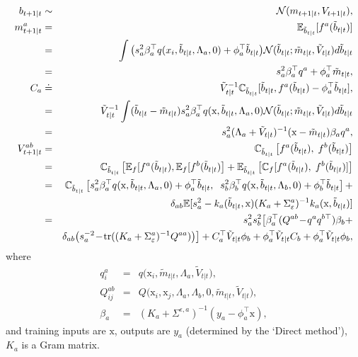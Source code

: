 \documentclass{article}
\newcommand{\N}{\mathcal{N}}
\newcommand{\C}{{\mathbb C}}
\newcommand{\E}{{\mathbb E}}
\newcommand{\unot}[1]{\tilde #1_{t|t}}     %
\newcommand{\pne}[1]{#1_{t+1|t}}   %
\newcommand{\inv}{^{-1}}
\newcommand{\nnn}{\nonumber \\}
\newcommand{\nn}{\nonumber}
\newcommand{\fb}{f} %
\newcommand{\bm}{m} %
\newcommand{\newlinetimesdist}{\hspace{0.3cm}\times\;}
\newcommand{\gplinear}{\phi} %
\begin{document}
\begin{eqnarray}
\pne{b}&\sim&\N(\pne{\bm},\pne{V}),\label{eq:pneb}\\
\pne{\bm}^a&=&\E_{\unot{b}}[\fb^a(\unot{b})]\nnn
&=&\int\big(s_a^2\beta_a^\top q(x_i,\unot{b},\Lambda_a,0)+\gplinear_a^\top\unot{b}\big){\cal N}(\unot{b};\unot{\bm},\unot{V})d\unot{b}\nnn
&=&s_a^2\beta_a^\top q^a+\gplinear_a^\top\unot{\bm},\label{eq:pnez}\\ %
C_a
&\doteq&\unot{V}\inv\C_{\unot{b}}[\unot{b},\fb^a(\unot{b})-\gplinear_a^\top\unot{b}],\nnn
&=&\unot{V}\inv\int(\unot{b}-\unot{\bm})s^2_a\beta_a^\top q(\text{x},\unot{b},\Lambda_a,0)\N(\unot{b};\unot{\bm},\unot{V})d\unot{b}\nnn
&=&s^2_a(\Lambda_a+\unot{V})^{-1}(\text{x}-\unot{\bm})\beta_aq^a,\label{eq:pneC}\\
\pne{V}^{ab}
&=&\C_{\unot{b}}\left[\fb^a(\unot{b}),\;\fb^b(\unot{b})\right]\nnn
%
&=&\C_{\unot{b}}\left[\E_f[\fb^a(\unot{b}), \E_f[\fb^b(\unot{b})\right]+\E_{\unot{b}}\left[\C_f[\fb^a(\unot{b}),\;\fb^b(\unot{b})]\right]\nnn
&=&\C_{\unot{b}}\left[s_a^2\beta_a^\top q(\text{x},\unot{b},\Lambda_a,0)+\gplinear_a^\top \unot{b},\;\;s_b^2\beta_b^\top q(\text{x},\unot{b},\Lambda_b,0)+\gplinear_b^\top \unot{b}\right]+\nnn
&&
\delta_{ab}\E[s_a^2-k_a(\unot{b},\text{x})(K_a+\Sigma_\varepsilon^a)^{-1}k_a(\text{x},\unot{b})]\label{eq:v}\nnn
%
&=& s_a^2s_b^2\big[\beta_a^\top ( Q^{ab}\!-\!q^a q^{b\top})\beta_b+\nnn
 &&\delta_{ab}\big(s_a^{-2}\!-\!\operatorname{tr}((K_a+\Sigma_\varepsilon^a)^{-1} Q^{aa})\big)\big]+
 C_a^\top\unot{V} \gplinear_b + \gplinear_a^\top\unot{V} C_b + \gplinear_a^\top\unot{V} \gplinear_b,\label{eq:pneV}
\end{eqnarray}
where
\begin{eqnarray}
q^a_i&=&q\big(\text{x}_i,\unot{\bm},\Lambda_a,\unot{V}\big),\nnn
Q^{ab}_{ij}&=&Q\big(\text{x}_i,\text{x}_j,\Lambda_a,\Lambda_b,0,\unot{\bm},\unot{V}\big),\nnn
\beta_a&=&(K_a+\Sigma^{\epsilon,a})^{-1}(y_a-\gplinear_a^\top\text{x}),\nn
\end{eqnarray}
and training inputs are $\text{x}$,
outputs are $y_a$ (determined by the `Direct method'),
$K_a$ is a Gram matrix. %
\end{document}
